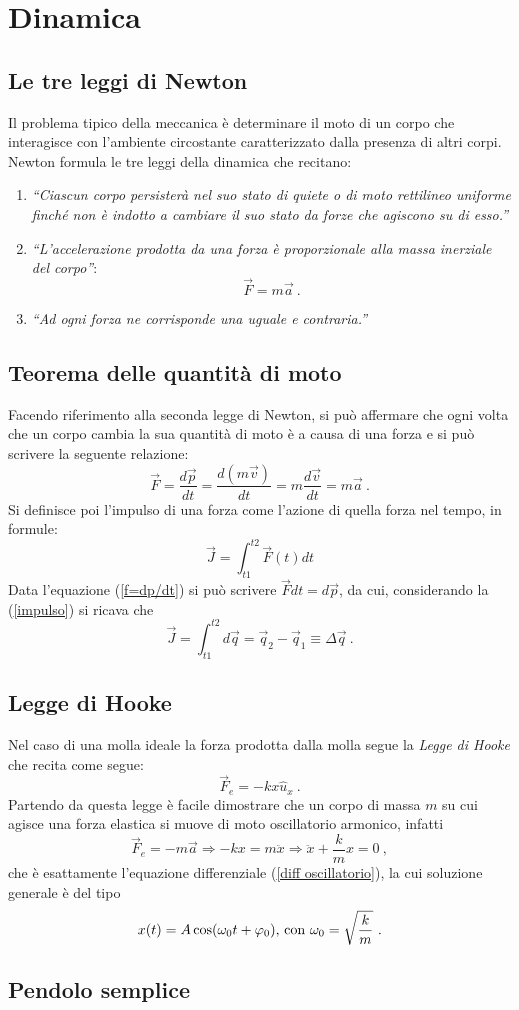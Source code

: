 \documentclass[12pt, oneside]{book}
\begin{document}
\chapter{Dinamica}
\section{Le tre leggi di Newton}
Il problema tipico della meccanica è determinare il moto di un corpo che interagisce con l'ambiente circostante caratterizzato dalla presenza di altri corpi. Newton formula le tre leggi della dinamica che recitano:
\begin{enumerate}
\item \textit{``Ciascun corpo persisterà nel suo stato di quiete o di moto rettilineo uniforme finché non è indotto a cambiare il suo stato da forze che agiscono su di esso.''}
\item \textit{``L'accelerazione prodotta da una forza è proporzionale alla massa inerziale del corpo''}:
\[\vec F = m\vec a~.\]
\item \textit{``Ad ogni forza ne corrisponde una uguale e contraria.''}
\end{enumerate}
\section{Teorema delle quantità di moto}
Facendo riferimento alla seconda legge di Newton, si può affermare che ogni volta che un corpo cambia la sua quantità di moto è a causa di una forza e si può scrivere la seguente relazione:
\begin{equation}
\label{f=dp/dt}
\vec{F}=\dfrac{d\vec{p}}{dt}=\dfrac{d(m\vec{v})}{dt}=m\dfrac{d\vec{v}}{dt}=m\vec{a}~.
\end{equation}
Si definisce poi l'impulso di una forza come l'azione di quella forza nel tempo, in formule:
\begin{equation}
\label{impulso}
\vec{J}=\int_{t1}^{t2}\vec{F}(t)dt
\end{equation}
Data l'equazione (\ref{f=dp/dt}) si può scrivere $\vec{F}dt=d\vec{p}$, da cui, considerando la (\ref{impulso}) si ricava che
\[\vec J =\int_{t1}^{t2} d\vec{q}=\vec{q}_2-\vec{q}_1\equiv\Delta\vec{q}~.\]

\section{Legge di Hooke}
Nel caso di una molla ideale la forza prodotta dalla molla segue la \textit{Legge di Hooke} che recita come segue:
\[\vec{F}_e=-kx\hat{u}_x~.\]
Partendo da questa legge è facile dimostrare che un corpo di massa $m$ su cui agisce una forza elastica si muove di moto oscillatorio armonico, infatti
\[\vec{F}_e=-m\vec a \Rightarrow -kx=m\ddot x\Rightarrow \ddot x + \dfrac{k}{m}x=0~,\]
che è esattamente l'equazione differenziale (\ref{diff oscillatorio}), la cui soluzione generale è del tipo
\[x(t)=A\cos (\omega_0 t + \varphi_0) \textnormal{, con } \omega_0 = \sqrt{\dfrac{k}{m}}~.\]

\section{Pendolo semplice}
\end{document}
